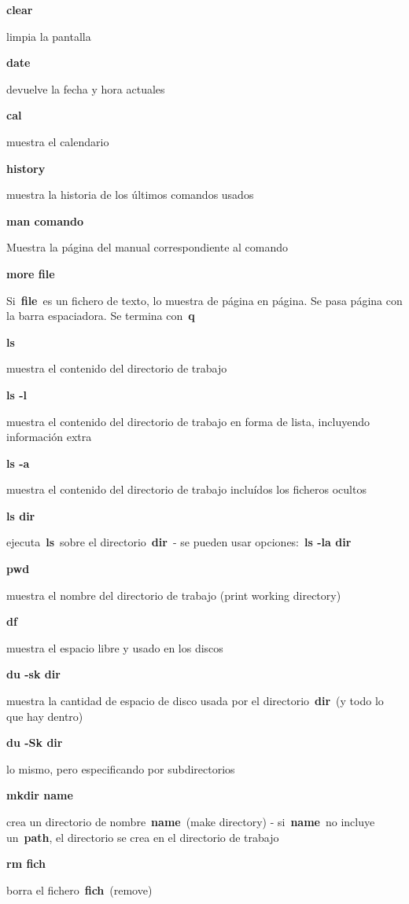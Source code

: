 \documentclass[
  jou,
  floatsintext,
  longtable,
  a4paper,
  nolmodern,
  notxfonts,
  notimes,
  12pt,
  colorlinks=true,linkcolor=blue,citecolor=blue,urlcolor=blue]{apa7}
\begin{document}
\textbf{clear}

limpia la pantalla

\textbf{date}

devuelve la fecha y hora actuales

\textbf{cal}

muestra el calendario

\textbf{history}

muestra la historia de los últimos comandos usados

\textbf{man comando}

Muestra la página del manual correspondiente al comando

\textbf{more file}

Si~\textbf{file}~es un fichero de texto, lo muestra de página en página.
Se pasa página con la barra espaciadora. Se termina con~\textbf{q}

\textbf{ls}

muestra el contenido del directorio de trabajo

\textbf{ls -l}

muestra el contenido del directorio de trabajo en forma de lista,
incluyendo información extra

\textbf{ls -a}

muestra el contenido del directorio de trabajo incluídos los ficheros
ocultos

\textbf{ls dir}

ejecuta~\textbf{ls}~sobre el directorio~\textbf{dir}~- se pueden usar
opciones:~\textbf{ls -la dir}

\textbf{pwd}

muestra el nombre del directorio de trabajo (print working directory)

\textbf{df}

muestra el espacio libre y usado en los discos

\textbf{du -sk dir}

muestra la cantidad de espacio de disco usada por el
directorio~\textbf{dir}~(y todo lo que hay dentro)

\textbf{du -Sk dir}

lo mismo, pero especificando por subdirectorios

\textbf{mkdir name}

crea un directorio de nombre~\textbf{name}~(make directory) -
si~\textbf{name}~no incluye un~\textbf{path}, el directorio se crea en
el directorio de trabajo

\textbf{rm fich}

borra el fichero~\textbf{fich}~(remove)
\end{document}
